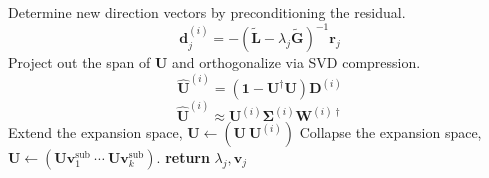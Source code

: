 \begin{algorithm}
\begin{algorithmic}[1]
            \EndIf
            \State
            Determine new direction vectors by preconditioning the residual.
            \[
                \mathbf{d}_j^{(i)}
                =
                -
                (
                    \tilde{\mathbf{L}}
                    -
                    \lambda_j
                    \tilde{\mathbf{G}}
                )^{-1}
                \mathbf{r}_j
            \]
            \State
            Project out the span of \(\mathbf{U}\) and orthogonalize via
            SVD compression.
            \[
                \widehat{\mathbf{U}}^{(i)}
                =
                (\mathbf{1} - \mathbf{U}^\dagger \mathbf{U})
                \mathbf{D}^{(i)}
            \]
            \[
                \widehat{\mathbf{U}}^{(i)}
                \approx
                \mathbf{U}^{(i)}
                \mathbf{\Sigma}^{(i)}
                \mathbf{W}^{(i)\dagger}
            \]
                \State
                Extend the expansion space,
                \(
                    \mathbf{U}
                    \leftarrow
                    (\mathbf{U}\ \mathbf{U}^{(i)})
                \)
            \Else
                \State
                Collapse the expansion space,
                \(
                    \mathbf{U}
                    \leftarrow
                    (
                        \mathbf{U}
                        \mathbf{v}_1^\mathrm{sub}\ 
                        \cdots\ 
                        \mathbf{U}
                        \mathbf{v}_k^\mathrm{sub}
                    )
                \).
            \EndIf
        \EndFor
        \State
        {\bfseries return}
        \(
            \lambda_j,
            \mathbf{v}_j
        \)
        \EndProcedure
    \end{algorithmic}
\end{algorithm}

